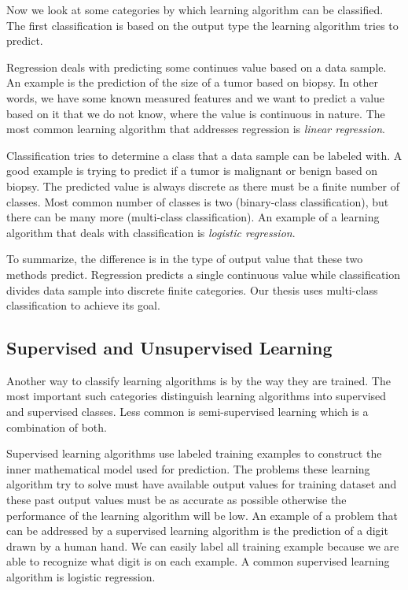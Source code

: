 Now we look at some categories by which learning algorithm can be classified. The first classification is based on the output type the learning algorithm tries to predict.

Regression deals with predicting some continues value based on a data sample. An example is the prediction of the size of a tumor based on biopsy. In other words, we have some known measured features and we want to predict a value based on it that we do not know, where the value is continuous in nature. The most common learning algorithm that addresses regression is \textit{linear regression}.

Classification tries to determine a class that a data sample can be labeled with. A good example is trying to predict if a tumor is malignant or benign based on biopsy. The predicted value is always discrete as there must be a finite number of classes. Most common number of classes is two (binary-class classification), but there can be many more (multi-class classification). An example of a learning algorithm that deals with classification is \textit{logistic regression}.

To summarize, the difference is in the type of output value that these two methods predict. Regression predicts a single continuous value while classification divides data sample into discrete finite categories. Our thesis uses multi-class classification to achieve its goal.

\subsection{Supervised and Unsupervised Learning}

Another way to classify learning algorithms is by the way they are trained. The most important such categories distinguish learning algorithms into supervised and supervised classes. Less common is semi-supervised learning which is a combination of both.

Supervised learning algorithms use labeled training examples to construct the inner mathematical model used for prediction. The problems these learning algorithm try to solve must have available output values for training dataset and these past output values must be as accurate as possible otherwise the performance of the learning algorithm will be low. An example of a problem that can be addressed by a supervised learning algorithm is the prediction of a digit drawn by a human hand. We can easily label all training example because we are able to recognize what digit is on each example. A common supervised learning algorithm is logistic regression.


